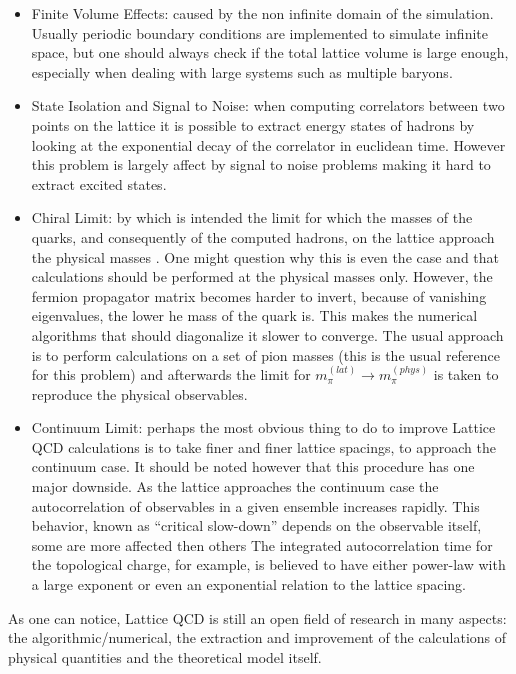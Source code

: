 \begin{itemize}
    \item Finite Volume Effects: caused by the non infinite domain of the simulation. Usually periodic boundary conditions are implemented to simulate infinite space, but one should always check if the total lattice volume is large enough, especially when dealing with large systems such as multiple baryons.
    \item State Isolation and Signal to Noise: when computing correlators between two points on the lattice it is possible to extract energy  states of hadrons by looking at the exponential decay of the correlator in euclidean time. However this problem is largely affect by signal to noise problems making it hard to extract excited states.
    \item Chiral Limit: by which is intended the limit for which the masses of the quarks, and consequently of the computed hadrons, on the lattice approach the physical masses \cite{fukaya_chiral_2008}. One might question why this is even the case and that calculations should be performed at the physical masses only. However, the fermion propagator matrix becomes harder to invert, because of vanishing eigenvalues, the lower he mass of the quark is. This makes the numerical algorithms that should diagonalize it slower to converge. The usual approach is to perform calculations on a set of pion masses (this is the usual reference for this problem) and afterwards the limit for $m_\pi^{(lat)} \rightarrow m_\pi^{(phys)}$ is taken to reproduce the physical observables.
    \item Continuum Limit: perhaps the most obvious thing to do to improve Lattice QCD calculations is to take finer and finer lattice spacings, to approach the continuum case. It should be noted however that this procedure has one major downside. As the lattice approaches the continuum case the autocorrelation of observables in a given ensemble increases rapidly. This behavior, known as ``critical slow-down'' \cite{schaefer_critical_2011} depends on the observable itself, some are more affected then others  The integrated autocorrelation time for the topological charge, for example, is believed to have either  power-law with a large exponent or even an exponential relation to the lattice spacing. 
\end{itemize}
As one can notice, Lattice QCD is still an open field of research in many aspects: the algorithmic/numerical, the extraction and improvement of the calculations of physical quantities and the theoretical model itself. 

